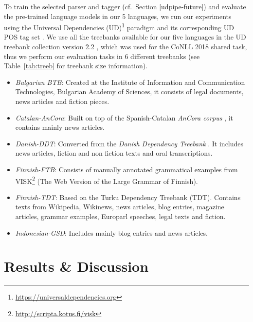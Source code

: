 To train the selected parser and tagger (cf.~Section \ref{udpipe-future}) and evaluate the pre-trained language models in our 5 languages, we run our experiments using the Universal Dependencies (UD)\footnote{\url{https://universaldependencies.org}} paradigm and its corresponding UD POS tag set \citep{petrov-etal-2012-universal}. We use all the treebanks available for our five languages in the UD treebank collection version 2.2 \citep{nivre-etal-2018-universal}, which was used for the CoNLL 2018 shared task, thus we perform our evaluation tasks in 6 different treebanks (see Table~\ref{tab:treeb} for treebank size information).
\begin{itemize}
    \item \emph{Bulgarian BTB}: Created at the Institute of Information and Communication Technologies, Bulgarian Academy of Sciences, it consists of legal documents, news articles and fiction pieces.
    \item \emph{Catalan-AnCora}: Built on top of the Spanish-Catalan \emph{AnCora corpus} \citep{taule-etal-2008-ancora}, it contains mainly news articles.
    \item \emph{Danish-DDT}: Converted from the \emph{Danish Dependency Treebank} \citep{buch-kromann-2003-the}. It includes news articles, fiction and non fiction texts and oral transcriptions.
    \item \emph{Finnish-FTB}: Consists of manually annotated grammatical examples from VISK\footnote{\url{http://scripta.kotus.fi/visk}} (The Web Version of the Large Grammar of Finnish).
    \item \emph{Finnish-TDT}: Based on the Turku Dependency Treebank (TDT). Contains texts from Wikipedia, Wikinews, news articles, blog entries, magazine articles, grammar examples, Europarl speeches, legal texts and fiction.
    \item \emph{Indonesian-GSD}: Includes mainly blog entries and news articles.
\end{itemize}


\section{Results \& Discussion}


